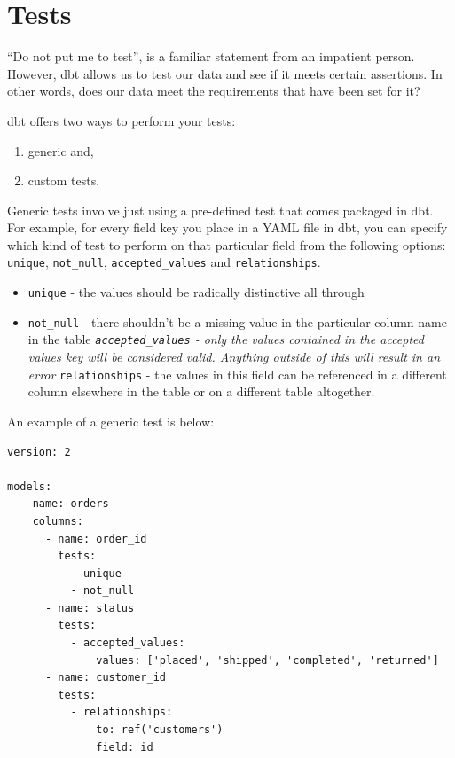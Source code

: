 \documentclass[
]{book}
\providecommand{\tightlist}{%
  \setlength{\itemsep}{0pt}\setlength{\parskip}{0pt}}
\begin{document}
\hypertarget{tests}{%
\section{Tests}\label{tests}}

``Do not put me to test'', is a familiar statement from an impatient person. However, dbt allows us to test our data and see if it meets certain assertions. In other words, does our data meet the requirements that have been set for it?

dbt offers two ways to perform your tests:

\begin{enumerate}
\def\labelenumi{\arabic{enumi}.}
\item
  generic and,
\item
  custom tests.
\end{enumerate}

Generic tests involve just using a pre-defined test that comes packaged in dbt. For example, for every field key you place in a YAML file in dbt, you can specify which kind of test to perform on that particular field from the following options: \texttt{unique}, \texttt{not\_null}, \texttt{accepted\_values} and \texttt{relationships}.

\begin{itemize}
\tightlist
\item
  \texttt{unique} - the values should be radically distinctive all through
\item
  \texttt{not\_null} - there shouldn't be a missing value in the particular column name in the table
  \emph{\texttt{accepted\_values} - only the values contained in the accepted values key will be considered valid. Anything outside of this will result in an error
  }\texttt{relationships} - the values in this field can be referenced in a different column elsewhere in the table or on a different table altogether.
\end{itemize}

An example of a generic test is below:

\begin{verbatim}
version: 2

models:
  - name: orders
    columns:
      - name: order_id
        tests:
          - unique
          - not_null
      - name: status
        tests:
          - accepted_values:
              values: ['placed', 'shipped', 'completed', 'returned']
      - name: customer_id
        tests:
          - relationships:
              to: ref('customers')
              field: id
\end{verbatim}
\end{document}
